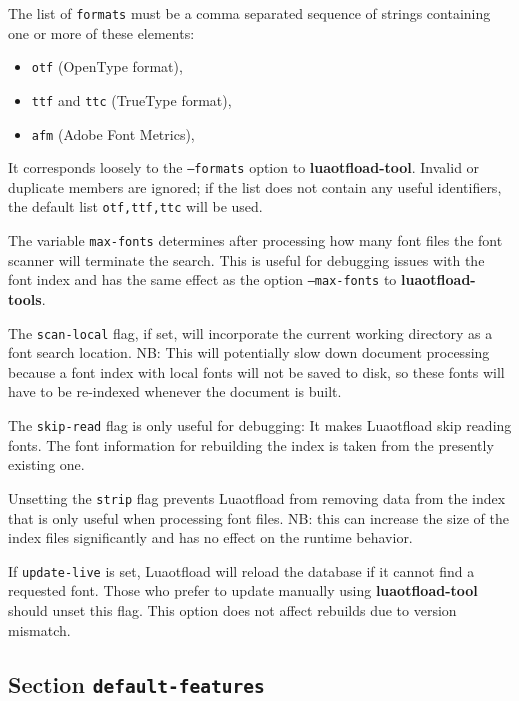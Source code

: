 \documentclass[a4paper]{article}
\begin{document}
The list of \texttt{formats} must be a comma separated sequence of strings
containing one or more of these elements:

\begin{itemize}
\item \texttt{otf}               (OpenType format),

\item \texttt{ttf} and \texttt{ttc}       (TrueType format),

\item \texttt{afm}               (Adobe Font Metrics),
\end{itemize}

It corresponds loosely to the \texttt{--formats} option to
\textbf{luaotfload-tool}. Invalid or duplicate members are ignored; if the
list does not contain any useful identifiers, the default list
\texttt{\textquotedbl{}otf,ttf,ttc\textquotedbl{}} will be used.

The variable \texttt{max-fonts} determines after processing how many font
files the font scanner will terminate the search. This is useful for
debugging issues with the font index and has the same effect as the
option \texttt{--max-fonts} to \textbf{luaotfload-tools}.

The \texttt{scan-local} flag, if set, will incorporate the current working
directory as a font search location. NB: This will potentially slow
down document processing because a font index with local fonts will not
be saved to disk, so these fonts will have to be re-indexed whenever
the document is built.

The \texttt{skip-read} flag is only useful for debugging: It makes
Luaotfload skip reading fonts. The font information for rebuilding the
index is taken from the presently existing one.

Unsetting the \texttt{strip} flag prevents Luaotfload from removing data
from the index that is only useful when processing font files. NB: this
can increase the size of the index files significantly and has no
effect on the runtime behavior.

If \texttt{update-live} is set, Luaotfload will reload the database if it
cannot find a requested font. Those who prefer to update manually using
\textbf{luaotfload-tool} should unset this flag. This option does not affect
rebuilds due to version mismatch.


\subsection{Section \texttt{default-features}%
  \label{section-default-features}%
}
\end{document}
